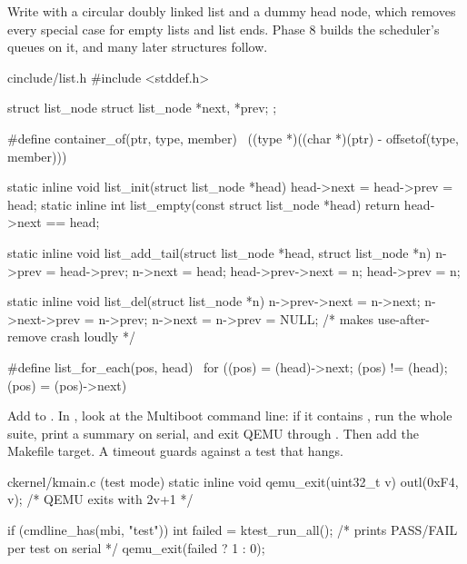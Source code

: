 \documentclass[11pt,a4paper]{article}
\begin{document}
Write  with a circular doubly linked list and a dummy head node, which removes every special
case for empty lists and list ends. Phase 8 builds the scheduler's queues on it, and many later structures follow.

\begin{lst}{c}{include/list.h}
#include <stddef.h>

struct list_node { struct list_node *next, *prev; };

#define container_of(ptr, type, member) \
    ((type *)((char *)(ptr) - offsetof(type, member)))

static inline void list_init(struct list_node *head) { head->next = head->prev = head; }
static inline int  list_empty(const struct list_node *head) { return head->next == head; }

static inline void list_add_tail(struct list_node *head, struct list_node *n)
{
    n->prev = head->prev;
    n->next = head;
    head->prev->next = n;
    head->prev = n;
}

static inline void list_del(struct list_node *n)
{
    n->prev->next = n->next;
    n->next->prev = n->prev;
    n->next = n->prev = NULL;      /* makes use-after-remove crash loudly */
}

#define list_for_each(pos, head) \
    for ((pos) = (head)->next; (pos) != (head); (pos) = (pos)->next)
\end{lst}

Add  to . In , look at the Multiboot command line: if it contains , run
the whole suite, print a summary on serial, and exit QEMU through . Then add the Makefile target.
A timeout guards against a test that hangs.

\begin{lst}{c}{kernel/kmain.c (test mode)}
static inline void qemu_exit(uint32_t v) { outl(0xF4, v); }   /* QEMU exits with 2v+1 */

if (cmdline_has(mbi, "test")) {
    int failed = ktest_run_all();          /* prints PASS/FAIL per test on serial */
    qemu_exit(failed ? 1 : 0);
}
\end{lst}

\end{document}
